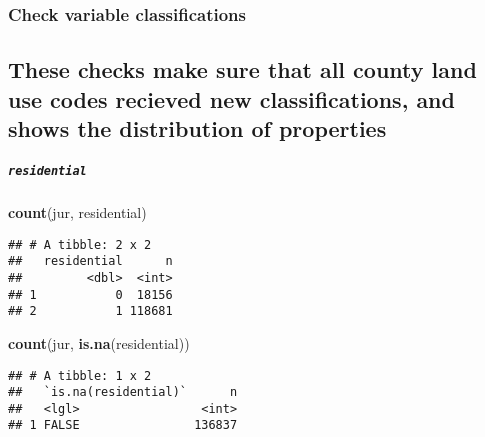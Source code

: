 \documentclass[]{article}
\newenvironment{Shaded}{\begin{snugshade}}{\end{snugshade}}
\newcommand{\KeywordTok}[1]{\textcolor[rgb]{0.13,0.29,0.53}{\textbf{#1}}}
\newcommand{\StringTok}[1]{\textcolor[rgb]{0.31,0.60,0.02}{#1}}
\newcommand{\OtherTok}[1]{\textcolor[rgb]{0.56,0.35,0.01}{#1}}
\newcommand{\ControlFlowTok}[1]{\textcolor[rgb]{0.13,0.29,0.53}{\textbf{#1}}}
\newcommand{\OperatorTok}[1]{\textcolor[rgb]{0.81,0.36,0.00}{\textbf{#1}}}
\newcommand{\NormalTok}[1]{#1}
\let\oldparagraph\paragraph
\renewcommand{\paragraph}[1]{\oldparagraph{#1}\mbox{}}
\let\oldsubparagraph\subparagraph
\renewcommand{\subparagraph}[1]{\oldsubparagraph{#1}\mbox{}}
\begin{document}
\subsubsection{Check variable
classifications}\label{check-variable-classifications}

\subsection{These checks make sure that all county land use codes
recieved new classifications, and shows the distribution of
properties}\label{these-checks-make-sure-that-all-county-land-use-codes-recieved-new-classifications-and-shows-the-distribution-of-properties}

\paragraph{}\label{section-1}

\subparagraph{\texorpdfstring{\texttt{residential}}{residential}}\label{residential-1}

\begin{Shaded}
\begin{Highlighting}[]
\KeywordTok{count}\NormalTok{(jur, residential)}
\end{Highlighting}
\end{Shaded}

\begin{verbatim}
## # A tibble: 2 x 2
##   residential      n
##         <dbl>  <int>
## 1           0  18156
## 2           1 118681
\end{verbatim}

\begin{Shaded}
\begin{Highlighting}[]
\KeywordTok{count}\NormalTok{(jur, }\KeywordTok{is.na}\NormalTok{(residential))}
\end{Highlighting}
\end{Shaded}

\begin{verbatim}
## # A tibble: 1 x 2
##   `is.na(residential)`      n
##   <lgl>                 <int>
## 1 FALSE                136837
\end{verbatim}

\begin{Shaded}
\end{Shaded}
\end{document}
